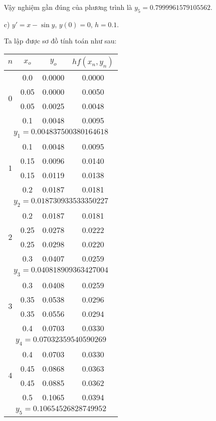 Vậy nghiệm gần đúng của phương trình là $y_5 = 0.7999961579105562$.\par

c) $y'=x-\sin y$, $y(0)=0$, $h=0.1$.\par
Ta lập được sơ đồ tính toán như sau:

\begin{longtable}{|c|c|c|c|}\hline
$n$&$x_o$ &$y_o$ &$hf(x_n,y_n)$ \\ \hline
\endhead

\multirow{4}{*}{$0$}
&0.0 &0.0000 &0.0000 \\ \cline{2-4}
&0.05 &0.0000 &0.0050 \\ \cline{2-4}
&0.05 &0.0025 &0.0048 \\ \cline{2-4}
&0.1 &0.0048 &0.0095 \\ \hline
\multicolumn{4}{|c|}{$y_1 = 0.004837500380164618$} \\ \hline

\multirow{4}{*}{$1$}
&0.1 &0.0048 &0.0095 \\ \cline{2-4}
&0.15 &0.0096 &0.0140 \\ \cline{2-4}
&0.15 &0.0119 &0.0138 \\ \cline{2-4}
&0.2 &0.0187 &0.0181 \\ \hline
\multicolumn{4}{|c|}{$y_2 = 0.018730933533350227$} \\ \hline

\multirow{4}{*}{$2$}
&0.2 &0.0187 &0.0181 \\ \cline{2-4}
&0.25 &0.0278 &0.0222 \\ \cline{2-4}
&0.25 &0.0298 &0.0220 \\ \cline{2-4}
&0.3 &0.0407 &0.0259 \\ \hline
\multicolumn{4}{|c|}{$y_3 = 0.040818909363427004$} \\ \hline

\multirow{4}{*}{$3$}
&0.3 &0.0408 &0.0259 \\ \cline{2-4}
&0.35 &0.0538 &0.0296 \\ \cline{2-4}
&0.35 &0.0556 &0.0294 \\ \cline{2-4}
&0.4 &0.0703 &0.0330 \\ \hline
\multicolumn{4}{|c|}{$y_4 = 0.07032359540590269$} \\ \hline

\multirow{4}{*}{$4$}
&0.4 &0.0703 &0.0330 \\ \cline{2-4}
&0.45 &0.0868 &0.0363 \\ \cline{2-4}
&0.45 &0.0885 &0.0362 \\ \cline{2-4}
&0.5 &0.1065 &0.0394 \\ \hline
\multicolumn{4}{|c|}{$y_5 = 0.10654526828749952$} \\ \hline


\end{longtable}

